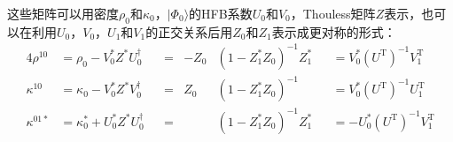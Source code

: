 这些矩阵可以用密度$\rho_{0}$和$\kappa_{0}$，$|\Phi_{0}\rangle$的HFB系数$U_{0}$和$V_{0}$，Thouless矩阵$Z$表示，也可以在利用$U_{0}$，$V_{0}$，$U_{1}$和$V_{1}$的正交关系后用$Z_{0}$和$Z_{1}$表示成更对称的形式：
\begin{alignat}{4}
\rho^{10} & =\rho_{0}-V^{*}_{0}Z^{*}U^{\dagger}_{0} &  & = & -Z_{0} & (1-Z^{*}_{1}Z_{0})^{-1}Z^{*}_{1} &  & =V^{*}_{0}(U^{\mathrm{T}})^{-1}V^{\mathrm{T}}_{1}\nonumber \\
\kappa^{10} & =\kappa_{0}-V^{*}_{0}Z^{*}V^{\dagger}_{0} &  & = & Z_{0} & (1-Z^{*}_{1}Z_{0})^{-1} &  & =V^{*}_{0}(U^{\mathrm{T}})^{-1}U^{\mathrm{T}}_{1}\label{eq:10 density and abnormal density}\\
\kappa^{01*} & =\kappa^{*}_{0}+U^{*}_{0}Z^{*}U^{\dagger}_{0} &  & = &  & (1-Z^{*}_{1}Z_{0})^{-1}Z^{*}_{1} &  & =-U^{*}_{0}(U^{\mathrm{T}})^{-1}V^{\mathrm{T}}_{1}\nonumber 
\end{alignat}

